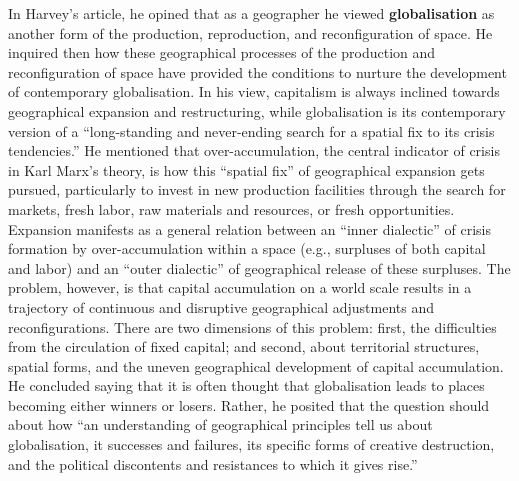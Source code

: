 \documentclass[a4paper, 10.5pt]{article} %
\begin{document}
In Harvey's article, he opined that as a geographer he viewed \textbf{globalisation} as another form of the production, reproduction, and reconfiguration of space. He inquired then how these geographical processes of the production and reconfiguration of space have provided the conditions to nurture the development of contemporary globalisation. In his view, capitalism is always inclined towards geographical expansion and restructuring, while globalisation is its contemporary version of a \enquote{long-standing and never-ending search for a spatial fix to its crisis tendencies.} He mentioned that over-accumulation, the central indicator of crisis in Karl Marx's theory, is how this \enquote{spatial fix} of geographical expansion gets pursued, particularly to invest in new production facilities through the search for markets, fresh labor, raw materials and resources, or fresh opportunities. Expansion manifests as a general relation between an \enquote{inner dialectic} of crisis formation by over-accumulation within a space (e.g., surpluses of both capital and labor) and an \enquote{outer dialectic} of geographical release of these surpluses. The problem, however, is that capital accumulation on a world scale results in a trajectory of continuous and disruptive geographical adjustments and reconfigurations. There are two dimensions of this problem: first, the difficulties from the circulation of fixed capital; and second, about territorial structures, spatial forms, and the uneven geographical development of capital accumulation. He concluded saying that it is often thought that globalisation leads to places becoming either winners or losers. Rather, he posited that the question should about how \enquote{an understanding of geographical principles tell us about globalisation, it successes and failures, its specific forms of creative destruction, and the political discontents and resistances to which it gives rise.}
\end{document}
